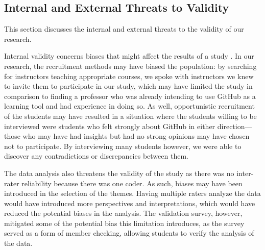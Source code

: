 %

\subsection{Internal and External Threats to Validity}
This section discusses the internal and external threats to the validity of our research.

Internal validity concerns biases that might affect the results of a study \cite{creswell2013research}. In our research, the recruitment methods may have biased the population: by searching for instructors teaching appropriate courses, we spoke with instructors we knew to invite them to participate in our study, which may have limited the study in comparison to finding a professor who was already intending to use GitHub as a learning tool and had experience in doing so. As well, opportunistic recruitment of the students may have resulted in a situation where the students willing to be interviewed were students who felt strongly about GitHub in either direction---those who may have had insights but had no strong opinions may have chosen not to participate. By interviewing many students however, we were able to discover any contradictions or discrepancies between them.

The data analysis also threatens the validity of the study as there was no inter-rater reliability because there was one coder. As such, biases may have been introduced in the selection of the themes. Having multiple raters analyze the data would have introduced more perspectives and interpretations, which would have reduced the potential biases in the analysis. The validation survey, however, mitigated some of the potential bias this limitation introduces, as the survey served as a form of member checking, allowing students to verify the analysis of the data.

